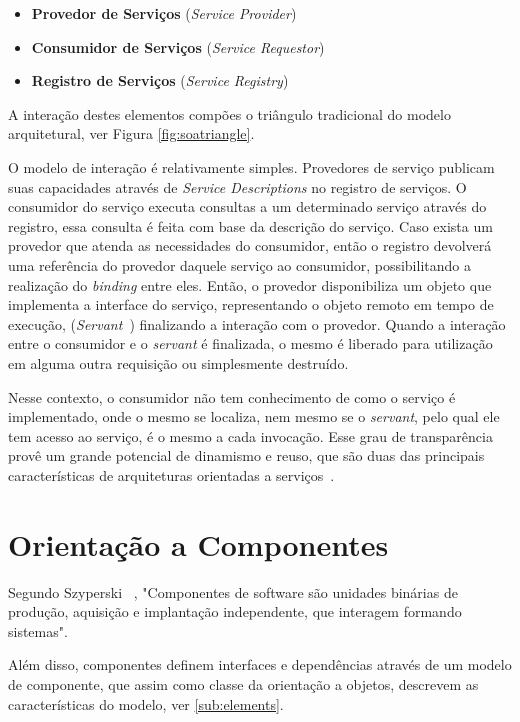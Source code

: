 \begin{itemize}
 \item \textbf{Provedor de Serviços} (\textit{Service Provider})
 \item \textbf{Consumidor de Serviços} (\textit{Service Requestor})
 \item \textbf{Registro de Serviços} (\textit{Service Registry})
\end{itemize}

A interação destes elementos compões o triângulo tradicional do modelo arquitetural, ver Figura \ref{fig:soatriangle}. 

O modelo de interação é relativamente simples. Provedores de serviço publicam suas capacidades através de \textit{Service Descriptions} no registro de serviços.
O consumidor do serviço executa consultas a um determinado serviço através do registro, essa consulta é feita com base da descrição do serviço. Caso exista um provedor que atenda as necessidades do consumidor, então o registro devolverá uma referência do provedor daquele serviço ao consumidor, possibilitando a realização do \textit{binding} entre eles. Então, o provedor disponibiliza um objeto que implementa a interface do serviço, representando o objeto remoto em tempo de execução, (\textit{Servant}~\cite{volter2005remoting}) finalizando a interação com o provedor. Quando a interação entre o consumidor e o \textit{servant} é finalizada, o mesmo é liberado para utilização em alguma outra requisição ou simplesmente destruído.

Nesse contexto, o consumidor não tem conhecimento de como o serviço é implementado, onde o mesmo se localiza, nem mesmo se o \textit{servant}, pelo qual ele tem acesso ao serviço, é o mesmo a cada invocação. Esse grau de transparência provê um grande potencial de dinamismo e reuso, que são duas das principais características de arquiteturas orientadas a serviços~\cite{davis2009open}.



\section{Orientação a Componentes}
Segundo Szyperski ~\cite{szyperski2002component}, "Componentes de software são unidades binárias de produção, aquisição e implantação independente, que interagem formando sistemas".

Além disso, componentes definem interfaces e dependências através de um modelo de componente, que assim como classe da orientação a objetos, descrevem as características do modelo, ver \ref{sub:elements}.

